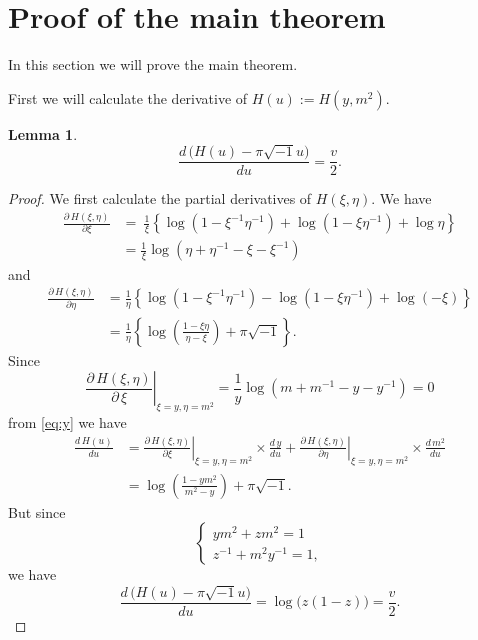 \documentclass[a4paper]{amsart}
\theoremstyle{plain}
\newtheorem{lem}[thm]{Lemma}
\theoremstyle{definition}
\theoremstyle{remark}
\numberwithin{equation}{section}
\begin{document}
\section{Proof of the main theorem}
In this section we will prove the main theorem.
\par
First we will calculate the derivative of $H(u):=H(y,m^2)$.
\begin{lem}
\begin{equation*}
  \frac{d\,\bigl(H(u)-\pi\sqrt{-1}u\bigr)}{du}
  =
  \frac{v}{2}.
\end{equation*}
\end{lem}
\begin{proof}
We first calculate the partial derivatives of $H(\xi,\eta)$.
We have
\begin{equation*}
\begin{split}
  \frac{\partial\,H(\xi,\eta)}{\partial\xi}
  &=
  \
  \frac{1}{\xi}
  \left\{
     \log\left(1-\xi^{-1}\eta^{-1}\right)
    +\log\left(1-\xi\eta^{-1}\right)
    +\log\eta
  \right\}
  \\
  &=
  \frac{1}{\xi}\log\left(\eta+\eta^{-1}-\xi-\xi^{-1}\right)
\end{split}
\end{equation*}
and
\begin{equation*}
\begin{split}
  \frac{\partial\,H(\xi,\eta)}{\partial\eta}
  &=
  \frac{1}{\eta}
  \left\{
     \log\left(1-\xi^{-1}\eta^{-1}\right)
    -\log\left(1-\xi\eta^{-1}\right)
    +\log(-\xi)
  \right\}
  \\
  &=
  \frac{1}{\eta}
  \left\{
    \log\left(\frac{1-\xi\eta}{\eta-\xi}\right)
    +\pi\sqrt{-1}
  \right\}.
\end{split}
\end{equation*}
Since
\begin{equation*}
  \left.\frac{\partial\,H(\xi,\eta)}{\partial\,\xi}\right|_{\xi=y,\eta=m^2}
  =
  \frac{1}{y}\log\left(m+m^{-1}-y-y^{-1}\right)
  =0
\end{equation*}
from \eqref{eq:y} we have
\begin{equation*}
\begin{split}
  \frac{d\,H(u)}{du}
  &=
  \left.\frac{\partial\,H(\xi,\eta)}{\partial\xi}\right|_{\xi=y,\eta=m^2}
  \times\frac{d\,y}{du}
  +
  \left.\frac{\partial\,H(\xi,\eta)}{\partial\eta}\right|_{\xi=y,\eta=m^2}
  \times\frac{d\,m^2}{du}
  \\
  &=
  \log\left(\frac{1-ym^2}{m^2-y}\right)+\pi\sqrt{-1}.
\end{split}
\end{equation*}
But since
\begin{equation*}
\begin{cases}
  ym^2+zm^2=1
  \\
  z^{-1}+m^2y^{-1}=1,
\end{cases}
\end{equation*}
we have
\begin{equation*}
  \frac{d\,\bigl(H(u)-\pi\sqrt{-1}u\bigr)}{du}
  =
  \log\bigl(z(1-z)\bigr)
  =
  \frac{v}{2}.
\end{equation*}
\end{proof}
\end{document}
